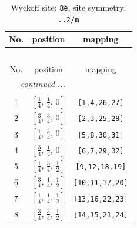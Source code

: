 \documentclass[fleqn,8pt]{jsarticle}
\begin{document}
\begin{longtable}{ccc}
\caption{Wyckoff site: {\tt 8e}, site symmetry: {\tt ..2/m}}
 \\
 \hline \hline
No. & position & mapping \\ \hline \endfirsthead

\multicolumn{2}{l}{\tablename\ \thetable{}} \\
 \hline \hline
No. & position & mapping \\ \hline \endhead

 \hline \hline
\multicolumn{2}{r}{\footnotesize\it continued ...} \\ \endfoot

 \hline \hline
\multicolumn{2}{r}{} \\ \endlastfoot

1 & $\left[ \frac{1}{4},\, \frac{1}{4},\, 0 \right]$ & {\tt [1,4,26,27]} \\ \hline
2 & $\left[ \frac{3}{4},\, \frac{3}{4},\, 0 \right]$ & {\tt [2,3,25,28]} \\ \hline
3 & $\left[ \frac{1}{4},\, \frac{3}{4},\, 0 \right]$ & {\tt [5,8,30,31]} \\ \hline
4 & $\left[ \frac{3}{4},\, \frac{1}{4},\, 0 \right]$ & {\tt [6,7,29,32]} \\ \hline
5 & $\left[ \frac{1}{4},\, \frac{3}{4},\, \frac{1}{2} \right]$ & {\tt [9,12,18,19]} \\ \hline
6 & $\left[ \frac{3}{4},\, \frac{1}{4},\, \frac{1}{2} \right]$ & {\tt [10,11,17,20]} \\ \hline
7 & $\left[ \frac{1}{4},\, \frac{1}{4},\, \frac{1}{2} \right]$ & {\tt [13,16,22,23]} \\ \hline
8 & $\left[ \frac{3}{4},\, \frac{3}{4},\, \frac{1}{2} \right]$ & {\tt [14,15,21,24]} \\
\end{longtable}
\renewcommand{\arraystretch}{1.2}
\end{document}
